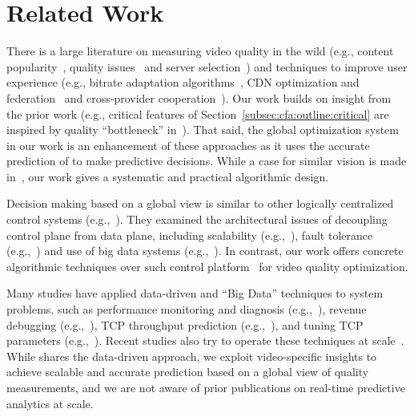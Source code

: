 \section{Related Work}
\label{sec:cfa:related}


There is a large literature on measuring video quality in the wild 
(e.g., content popularity~\cite{plissonneau2012longitudinal,beijing-imc09}, 
quality issues~\cite{jiang2013shedding} and server 
selection~\cite{youtubecdn,su2006drafting}) and techniques to 
improve user experience (e.g., bitrate adaptation 
algorithms~\cite{yin2015control,festive,huang2014buffer}, CDN 
optimization and federation~\cite{sigcomm12cdnmulti,
peterson2013framework,balachandran2013analyzing,
mukerjee2015practical} and cross-provider 
cooperation~\cite{yu2012tradeoffs,frank2013pushing,eona}). 
Our work builds on insight from the prior work (e.g., critical features 
of Section~\ref{subsec:cfa:outline:critical} are inspired by quality ``bottleneck'' 
in~\cite{jiang2013shedding}). 
That said, the global optimization system in our work is an 
enhancement of these approaches as it  uses the accurate prediction 
of \dda to make predictive decisions. 
While a case for similar vision is made in~\cite{sigcomm12}, our work 
gives a systematic and practical algorithmic design.

Decision making based on a global view is similar to other logically 
centralized control systems (e.g.,~\cite{rcp,sigcomm12,c3,
suresh2015c3}). They examined the architectural issues of 
decoupling control plane from data plane, including scalability 
(e.g.,~\cite{tootoonchian2012controller,dixit2013towards}), fault 
tolerance (e.g.,~\cite{panda2013cap,yan2007tesseract}) and use of 
big data systems (e.g.,~\cite{c3,spark}). 
In contrast, our work offers concrete algorithmic techniques over 
such control platform~\cite{c3} for video quality optimization. 

Many studies have applied data-driven and ``Big Data'' techniques 
to system problems, such as performance monitoring and diagnosis 
(e.g.,~\cite{stemm2000network,choffnes2010crowdsourcing,
sambasivan2011diagnosing}), revenue debugging 
(e.g.,~\cite{bhagwan2014adtributor}), TCP throughput prediction 
(e.g.,~\cite{he2005predictability,mirza2007machine}), and tuning 
TCP parameters (e.g.,~\cite{seshan1997spand,savage1999case}). 
Recent studies also try to operate these techniques at 
scale~\cite{velox-cidr}.
While \dda shares the data-driven approach, we exploit video-specific 
insights to achieve scalable and accurate prediction based on a global 
view of quality measurements, and we are not aware of prior 
publications on real-time predictive analytics at scale.

